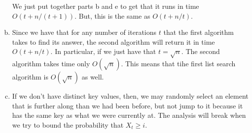 \documentclass{article}
\begin{document}
\begin{enumerate}[a.]
We just put together parts b and e to get that it runs in time $O(t+n/(t+1))$. But, this is the same as $O(t+n/t)$.

\item

Since we have that for any number of iterations $t$ that the first algorithm takes to find its answer, the second algorithm will return it in time $O(t+ n/t)$. In particular, if we just have that $t = \sqrt{n}$. The second algorithm takes time only $O(\sqrt{n})$. This means that tihe first list search algorithm is $O(\sqrt{n})$ as well.

\item


If we don't have distinct key values, then, we may randomly select an element that is further along than we had been before, but not jump to it because it has the same key as what we were currently at. The analysis will break when we try to bound the probability that $X_t \ge i$.

\end{enumerate}
\end{document}
